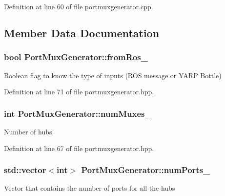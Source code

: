 Definition at line 60 of file portmuxgenerator.\-cpp.



\subsection{Member Data Documentation}
\hypertarget{classPortMuxGenerator_ab3876f874fe7230a5585d203cda2ff3b}{
\subsubsection[{from\-Ros\-\_\-}]{\setlength{\rightskip}{0pt plus 5cm}bool Port\-Mux\-Generator\-::from\-Ros\-\_\-\hspace{0.3cm}{\ttfamily [private]}}}\label{classPortMuxGenerator_ab3876f874fe7230a5585d203cda2ff3b}
Boolean flag to know the type of inputs (R\-O\-S message or Y\-A\-R\-P Bottle) 

Definition at line 71 of file portmuxgenerator.\-hpp.

\hypertarget{classPortMuxGenerator_a48cec4ed3c40d0fb987a85dbcb2f02ac}{
\subsubsection[{num\-Muxes\-\_\-}]{\setlength{\rightskip}{0pt plus 5cm}int Port\-Mux\-Generator\-::num\-Muxes\-\_\-\hspace{0.3cm}{\ttfamily [private]}}}\label{classPortMuxGenerator_a48cec4ed3c40d0fb987a85dbcb2f02ac}
Number of hubs 

Definition at line 67 of file portmuxgenerator.\-hpp.

\hypertarget{classPortMuxGenerator_addec6f43a703f42fe99a3fc8f877dd1d}{
\subsubsection[{num\-Ports\-\_\-}]{\setlength{\rightskip}{0pt plus 5cm}std\-::vector$<$int$>$ Port\-Mux\-Generator\-::num\-Ports\-\_\-\hspace{0.3cm}{\ttfamily [private]}}}\label{classPortMuxGenerator_addec6f43a703f42fe99a3fc8f877dd1d}
Vector that contains the number of ports for all the hubs 


